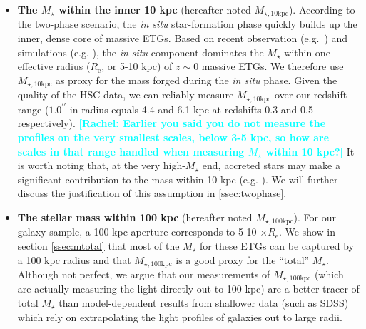 \documentclass[a4paper,fleqn,usenatbib]{mnras}
\def\arcsec{{\prime\prime}}
\def\mstar{{$M_{\star}$}}
\def\minn{{$M_{\star,10\mathrm{kpc}}$}}
\def\mtot{{$M_{\star,100\mathrm{kpc}}$}}
\newcommand{\rachel}[1]{\textcolor{cyan}{\textbf{[Rachel: #1]}}}
\begin{document}
    \begin{itemize} 
       
        \item \textbf{The \mstar{} within the inner 10 kpc} 
            (hereafter noted \minn{}). 
            According to the two-phase scenario, the \textit{in situ} star-formation phase quickly builds up the inner, dense core of massive ETGs.  
            Based on recent observation (e.g.~\citealt{vanDokkum2010}) and 
            simulations (e.g. \citealt{RodriguezGomez2016}), the \textit{in situ} 
            component dominates the \mstar{} within one effective radius 
            ($R_{\mathrm{e}}$, or 5-10 kpc) of $z{\sim}0$ massive ETGs.
            We therefore use \minn{} as proxy for the mass forged during the 
            \textit{in situ} phase. 
            Given the quality of the HSC data, we can reliably measure \minn{} over 
            our redshift range ($1.0^{\arcsec}$ in radius equals 4.4 and 6.1 kpc 
            at redshifts 0.3 and 0.5 respectively).  
\rachel{Earlier you said you do not measure the profiles on the very smallest scales, below 3-5 kpc, so how are scales in that range handled when measuring \mstar{} within 10 kpc?}
It is worth noting that, at the very high-\mstar{} end, accreted stars may make a significant contribution to the mass within 10 kpc 
            (e.g. \citealt{RodriguezGomez2016}). We will further discuss the justification of this assumption in 
            \ref{ssec:twophase}.
            
        \item \textbf{The stellar mass within 100 kpc} 
            (hereafter noted \mtot{}). 
            For our galaxy sample, a 100 kpc aperture corresponds to 5-10 
            $\times R_{\mathrm{e}}$. 
            We show in section \ref{ssec:mtotal} that most of the \mstar{} for 
            these ETGs can be captured by a 100 kpc radius and that \mtot{} is 
            a good proxy for the ``total'' \mstar{}. 
            Although not perfect, we argue that our measurements of \mtot{} (which are 
            actually measuring the light directly out to 100 kpc) are a better tracer 
            of total \mstar{} than model-dependent results from shallower data 
            (such as SDSS) which rely on extrapolating the light profiles of galaxies 
            out to large radii.
            
       \end{itemize}
       
    
\end{document}
